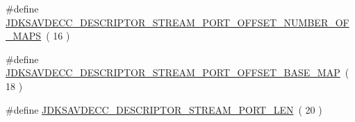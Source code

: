 \begin{DoxyCompactItemize}
\item 
\#define \hyperlink{group__descriptor__stream__port_ga1312ee9e94eb7d08859a1681967328aa}{J\+D\+K\+S\+A\+V\+D\+E\+C\+C\+\_\+\+D\+E\+S\+C\+R\+I\+P\+T\+O\+R\+\_\+\+S\+T\+R\+E\+A\+M\+\_\+\+P\+O\+R\+T\+\_\+\+O\+F\+F\+S\+E\+T\+\_\+\+N\+U\+M\+B\+E\+R\+\_\+\+O\+F\+\_\+\+M\+A\+PS}~( 16 )
\item 
\#define \hyperlink{group__descriptor__stream__port_ga797ae923dddcf38e07bf98db516fb082}{J\+D\+K\+S\+A\+V\+D\+E\+C\+C\+\_\+\+D\+E\+S\+C\+R\+I\+P\+T\+O\+R\+\_\+\+S\+T\+R\+E\+A\+M\+\_\+\+P\+O\+R\+T\+\_\+\+O\+F\+F\+S\+E\+T\+\_\+\+B\+A\+S\+E\+\_\+\+M\+AP}~( 18 )
\item 
\#define \hyperlink{group__descriptor__stream__port_ga1b3e49096f01beb5bfac0e22093adc0b}{J\+D\+K\+S\+A\+V\+D\+E\+C\+C\+\_\+\+D\+E\+S\+C\+R\+I\+P\+T\+O\+R\+\_\+\+S\+T\+R\+E\+A\+M\+\_\+\+P\+O\+R\+T\+\_\+\+L\+EN}~( 20 )
\end{DoxyCompactItemize}
